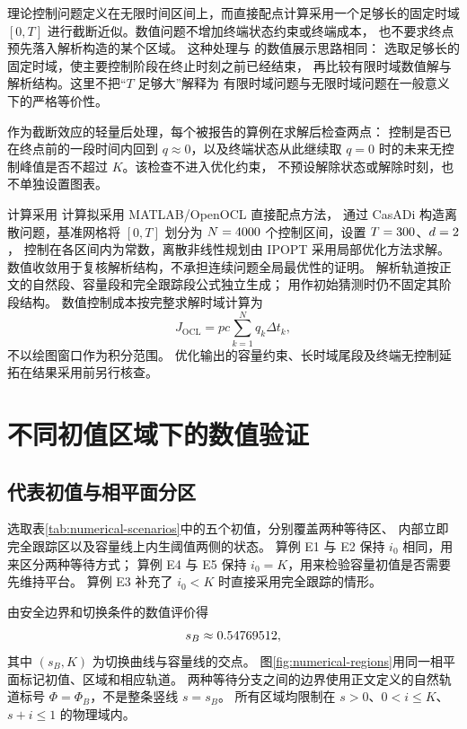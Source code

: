 理论控制问题定义在无限时间区间上，而直接配点计算采用一个足够长的固定时域
$[0,T]$ 进行截断近似。数值问题不增加终端状态约束或终端成本，
也不要求终点预先落入解析构造的某个区域。
这种处理与 \citet[第6节]{AvramFreddiGoreac2022} 的数值展示思路相同：
选取足够长的固定时域，使主要控制阶段在终止时刻之前已经结束，
再比较有限时域数值解与解析结构。这里不把“$T$ 足够大”解释为
有限时域问题与无限时域问题在一般意义下的严格等价性。

作为截断效应的轻量后处理，每个被报告的算例在求解后检查两点：
控制是否已在终点前的一段时间内回到 $q\approx0$，以及终端状态从此继续取
$q=0$ 时的未来无控制峰值是否不超过 $K$。该检查不进入优化约束，
不预设解除状态或解除时刻，也不单独设置图表。

\ifNumResultsVerified
计算采用
\else
计算拟采用
\fi
MATLAB/OpenOCL 直接配点方法\citep{Koenemann2019OpenOCL}，
通过 CasADi\citep{Andersson2019CasADi} 构造离散问题，基准网格将 $[0,T]$ 划分为
$N=4000$ 个控制区间，设置 $T=300$、$d=2$，
控制在各区间内为常数，离散非线性规划由 IPOPT 采用局部优化方法求解\citep{WachterBiegler2006}。
数值收敛用于复核解析结构，不承担连续问题全局最优性的证明。
\NumMeshDetails
解析轨道按正文的自然段、容量段和完全跟踪段公式独立生成；
用作初始猜测时仍不固定其阶段结构。
数值控制成本按完整求解时域计算为
\begin{equation}
 J_{\mathrm{OCL}}=pc\sum_{k=1}^{N}q_k\Delta t_k,
 \label{eq:numerical-cost-sum}
\end{equation}
不以绘图窗口作为积分范围。
优化输出的容量约束、长时域尾段及终端无控制延拓在结果采用前另行核查。
\NumFindingParagraph{\NumCheckStatement}

\section{不同初值区域下的数值验证}
\label{sec:numerical-results}

\subsection{代表初值与相平面分区}

选取表\ref{tab:numerical-scenarios}中的五个初值，分别覆盖两种等待区、
内部立即完全跟踪区以及容量线上内生阈值两侧的状态。
算例 E1 与 E2 保持 $i_0$ 相同，用来区分两种等待方式；
算例 E4 与 E5 保持 $i_0=K$，用来检验容量初值是否需要先维持平台。
算例 E3 补充了 $i_0<K$ 时直接采用完全跟踪的情形。

由安全边界和切换条件的数值评价得
\begin{equation}
 s_B\approx0.54769512,
 \label{eq:numerical-sB}
\end{equation}
其中 $(s_B,K)$ 为切换曲线与容量线的交点。
图\ref{fig:numerical-regions}用同一相平面标记初值、区域和相应轨道。
两种等待分支之间的边界使用正文定义的自然轨道标号
$\Phi=\Phi_B$，不是整条竖线 $s=s_B$。
所有区域均限制在 $s>0$、$0<i\le K$、$s+i\le1$ 的物理域内。

